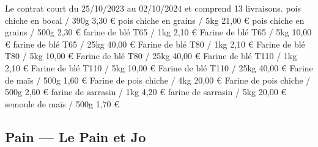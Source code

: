 \documentclass[10pt,a4paper,french]{article}
\makeatletter
\newcommand{\authoredby}[1]{\addtocontents{toc}{\protect\@nameuse{authoredby#1}}}%
\makeatother
\begin{document}
\noindent Le contrat court du 25/10/2023 au 02/10/2024 et comprend 13 livraisons.\newline\newline
{\color{Blue} pois chiche en bocal / 390g 3,30 € }\newline
{\color{Blue} pois chiche en grains / 5kg 21,00 € }\newline
{\color{Blue} pois chiche en grains / 500g 2,30 € }\newline
{\color{Blue} farine de blé T65 / 1kg 2,10 € }\newline
{\color{Blue} Farine de blé T65 / 5kg 10,00 €}\newline
{\color{Blue} farine de blé T65 / 25kg 40,00 € }\newline
{\color{Blue} Farine de blé T80 / 1kg 2,10 € }\newline
{\color{Blue} Farine de blé T80 / 5kg 10,00 € }\newline
{\color{Blue} Farine de blé T80 / 25kg 40,00 € }\newline
{\color{Blue} Farine de blé T110 / 1kg 2,10 € }\newline
{\color{Blue} Farine de blé T110 / 5kg 10,00 € }\newline
{\color{Blue} Farine de blé T110 / 25kg 40,00 €}\newline
{\color{Blue} Farine de maïs / 500g 1,60 €}\newline
{\color{Blue} Farine de pois chiche / 4kg 20,00 € }\newline
{\color{Blue} Farine de pois chiche / 500g 2,60 €}\newline
{\color{Blue} farine de sarrasin / 1kg 4,20 € }\newline
{\color{Blue} farine de sarrasin / 5kg 20,00 € }\newline
{\color{Blue} semoule de maïs / 500g 1,70 €}

\newpage

\authoredby{B}
\subsection{Pain --- Le Pain et Jo}
\end{document}
